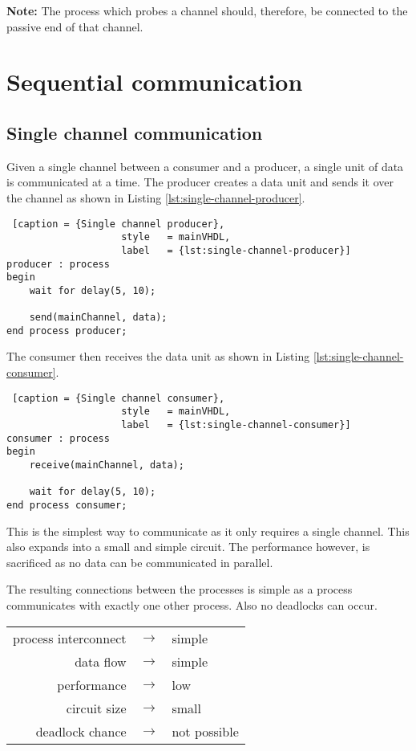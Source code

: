 \documentclass{report}
\begin{document}
\textbf{Note:} The process which probes a channel should, therefore, be
connected to the passive end of that channel.


\section{Sequential communication}

\subsection{Single channel communication}

Given a single channel between a consumer and a producer, a single unit of data
is communicated at a time. The producer creates a data unit and sends it over
the channel as shown in Listing \ref{lst:single-channel-producer}.

\begin{lstlisting} [caption = {Single channel producer},
                    style   = mainVHDL,
                    label   = {lst:single-channel-producer}]
producer : process
begin
    wait for delay(5, 10);

    send(mainChannel, data);
end process producer;
\end{lstlisting}

The consumer  then receives the data unit as shown in Listing
\ref{lst:single-channel-consumer}.

\begin{lstlisting} [caption = {Single channel consumer},
                    style   = mainVHDL,
                    label   = {lst:single-channel-consumer}]
consumer : process
begin
    receive(mainChannel, data);

    wait for delay(5, 10);
end process consumer;

\end{lstlisting}

This is the simplest way to communicate as it only requires a single channel.
This also expands into a small and simple circuit. The performance however,
is sacrificed as no data can be communicated in parallel.

The resulting connections between the processes is simple as a process
communicates with exactly one other process. Also no deadlocks can occur.

\begin{table}[H]
    \centering
    \begin{tabular}{ r c l }
        process interconnect & $\rightarrow$ & simple \\
        data flow            & $\rightarrow$ & simple \\
        performance          & $\rightarrow$ & low \\
        circuit size         & $\rightarrow$ & small \\
        deadlock chance      & $\rightarrow$ & not possible \\
    \end{tabular}
\end{table}
\end{document}
